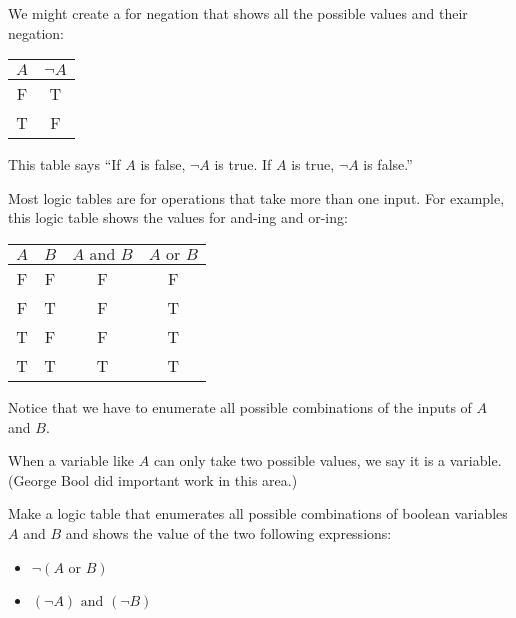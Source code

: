 We might create a  for negation that shows all
the possible values and their negation:

\begin{tabular}{c | c}
  $A$ & $\neg A$ \\
  \hline
  F & T \\
  T & F
\end{tabular}

This table says ``If $A$ is false, $\neg A$ is true. If $A$ is true,
$\neg A$ is false.''

Most logic tables are for operations that take more than one input.
For example, this logic table shows the values for and-ing and or-ing:

\begin{tabular}{c | c | c | c}
  $A$ & $B$ & $A \text{ and } B$ & $A \text{ or } B$ \\
  \hline
  F & F & F & F \\
  F & T & F & T \\
  T & F & F & T \\
  T & T & T & T \\
\end{tabular}

Notice that we have to enumerate all possible combinations of the
inputs of $A$ and $B$.

When a variable like $A$ can only take two possible values, we say it
is a  variable. (George Bool did important work in
this area.)

\begin{Exercise}[title={Logic Table}, label=logic_table]

  Make a logic table that enumerates all possible combinations of boolean variables $A$ and $B$ and shows the value of the two following expressions:
  \begin{itemize}
  \item $\neg \left(A \text{ or } B \right)$
  \item $\left(\neg A \right) \text{ and } \left(\neg B \right)$ 
  \end{itemize}

\end{Exercise}

